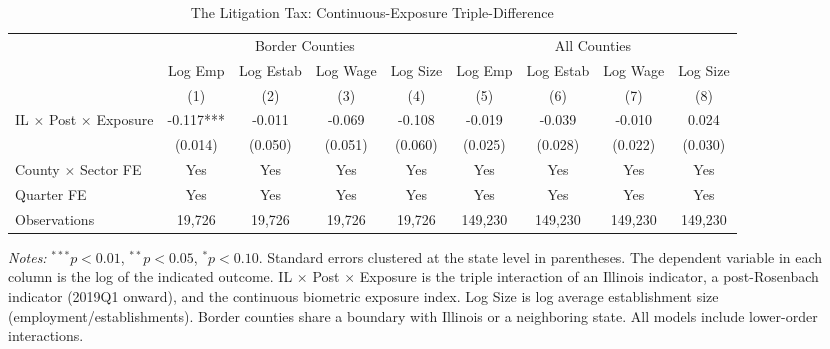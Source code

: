 \begin{table}[htbp]
\centering
\caption{The Litigation Tax: Continuous-Exposure Triple-Difference}
\label{tab:main}
\begin{tabular}{lcccccccc}
\toprule
 & \multicolumn{4}{c}{Border Counties} & \multicolumn{4}{c}{All Counties} \\
\cmidrule(lr){2-5} \cmidrule(lr){6-9}
 & Log Emp & Log Estab & Log Wage & Log Size & Log Emp & Log Estab & Log Wage & Log Size \\
 & (1) & (2) & (3) & (4) & (5) & (6) & (7) & (8) \\
\midrule
IL $\times$ Post $\times$ Exposure & -0.117*** & -0.011 & -0.069 & -0.108 & -0.019 & -0.039 & -0.010 & 0.024 \\
 & (0.014) & (0.050) & (0.051) & (0.060) & (0.025) & (0.028) & (0.022) & (0.030) \\
\midrule
County $\times$ Sector FE & Yes & Yes & Yes & Yes & Yes & Yes & Yes & Yes \\
Quarter FE & Yes & Yes & Yes & Yes & Yes & Yes & Yes & Yes \\
Observations & 19,726 & 19,726 & 19,726 & 19,726 & 149,230 & 149,230 & 149,230 & 149,230 \\
\bottomrule
\end{tabular}
\begin{tablenotes}[flushleft]
\small
\item \textit{Notes:} $^{***}p<0.01$, $^{**}p<0.05$, $^{*}p<0.10$. Standard errors clustered at the state level in parentheses. The dependent variable in each column is the log of the indicated outcome. IL $\times$ Post $\times$ Exposure is the triple interaction of an Illinois indicator, a post-Rosenbach indicator (2019Q1 onward), and the continuous biometric exposure index. Log Size is log average establishment size (employment/establishments). Border counties share a boundary with Illinois or a neighboring state. All models include lower-order interactions.
\end{tablenotes}
\end{table}
